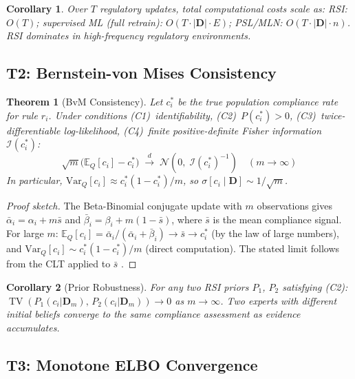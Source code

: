 \documentclass[letterpaper]{article}
\newtheorem{theorem}{Theorem}
\newtheorem{corollary}{Corollary}[theorem]
\begin{document}
\begin{corollary}
Over $T$ regulatory updates, total computational costs scale as:
RSI: $O(T)$;
supervised ML (full retrain): $O(T \cdot |\mathbf{D}| \cdot E)$;
PSL/MLN: $O(T \cdot |\mathbf{D}| \cdot n)$.
RSI dominates in high-frequency regulatory environments.
\end{corollary}

\subsection{T2: Bernstein-von Mises Consistency}

\begin{theorem}[BvM Consistency]
\label{thm:bvm}
Let $c_i^*$ be the true population compliance rate for rule $r_i$.
Under conditions (C1)~identifiability, (C2)~$P(c_i^*) > 0$,
(C3)~twice-differentiable log-likelihood,
(C4)~finite positive-definite Fisher information $\mathcal{I}(c_i^*)$:
\[
  \sqrt{m}\bigl(\mathbb{E}_Q[c_i] - c_i^*\bigr)
  \;\xrightarrow{d}\;
  \mathcal{N}\!\left(0,\;\mathcal{I}(c_i^*)^{-1}\right)
  \quad (m \to \infty)
\]
In particular, $\mathrm{Var}_Q[c_i] \approx c_i^*(1-c_i^*)/m$,
so $\sigma[c_i \mid \mathbf{D}] \sim 1/\sqrt{m}$.
\end{theorem}

\begin{proof}[Proof sketch]
The Beta-Binomial conjugate update with $m$ observations gives
$\bar{\alpha}_i = \alpha_i + m\bar{s}$ and
$\bar{\beta}_i = \beta_i + m(1-\bar{s})$, where $\bar{s}$ is the
mean compliance signal. For large $m$:
$\mathbb{E}_Q[c_i] = \bar{\alpha}_i/(\bar{\alpha}_i + \bar{\beta}_i) \to \bar{s} \to c_i^*$
(by the law of large numbers), and
$\mathrm{Var}_Q[c_i] \sim c_i^*(1-c_i^*)/m$ (direct computation).
The stated limit follows from the CLT applied to $\bar{s}$
\citep{van2000asymptotic}.
\end{proof}

\begin{corollary}[Prior Robustness]
For any two RSI priors $P_1$, $P_2$ satisfying (C2):
$\operatorname{TV}(P_1(c_i|\mathbf{D}_m),\, P_2(c_i|\mathbf{D}_m)) \to 0$
as $m \to \infty$. Two experts with different initial beliefs converge
to the same compliance assessment as evidence accumulates.
\end{corollary}

\subsection{T3: Monotone ELBO Convergence}
\end{document}
